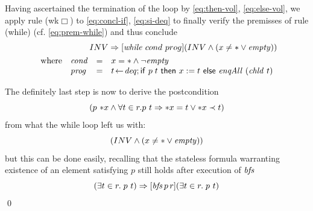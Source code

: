 Having ascertained the termination of the loop by \eqref{eq:then-vol},
\eqref{eq:else-vol}, we apply rule (wk$\Box$) to \eqref{eq:concl-if},
\eqref{eq:si-deq} to finally verify the premisses of rule (while) (cf.
\eqref{eq:prem-while}) and thus conclude
\begin{eqnarray*}
INV \Rightarrow [\WhileTerm{cond}{prog}](INV \land (x \neq \unit \lor \qmt)) \\
\begin{array}{ll@{\quad = \quad}l}
\text{where} & \op{cond} & x =  \unit \land \lnot \qmt \\
  &            \op{prog} & t \leteq \deq; \IfTerm{p\;t}{x:=t}{\enqAll~(\chld\ t)}
\end{array}
\end{eqnarray*}

The definitely last step is now to derive the postcondition 
\[
(p\  {\ast x} \land \forall t \in r. p\ t \Rightarrow {\ast x} =  t \lor {\ast x} \prec t)
\]
from what the while loop left us with:
\[
(INV \land (x \neq \ast \lor \mathit{empty})) 
\]
but this can be done easily, recalling that the stateless formula warranting
existence of an element satisfying $p$ still holds after execution of $\mathit{bfs}$
\[
(\exists t \in r.\; p\ t) \Rightarrow [\mathit{bfs}\,p\, r](\exists t \in r.\; p\ t)
\]
{\hfill \qed}


